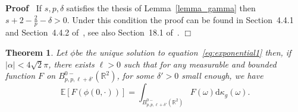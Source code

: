\documentclass[a4paper,10pt]{article}
\newcommand{\mathd}{\mathrm{d}}
\newenvironment{proof}{\noindent\textbf{Proof\ }}{\hspace*{\fill}$\Box$\medskip}
\newtheorem{theorem}{Theorem}
\begin{document}
\begin{proof}
  If $s, p, \delta$ satisfies the thesis of Lemma~\ref{lemma_gamma} then $s +
  2 - \frac{2}{p} - \delta > 0$. Under this condition the proof can be found
  in Section~4.4.1 and Section~4.4.2 of~{\cite{Triebel1992}}, see also
  Section~18.1 of~{\cite{Triebel1997}}.
\end{proof}

\begin{theorem}
  \label{theorem_dimensionalreduction1}Let $\phi$be the unique solution to
  equation~{\eqref{eq:exponential1}} then, if $| \alpha | < 4 \sqrt{2} \pi$,
  there exists $\ell > 0$ such that for any measurable and bounded function
  $F$ on $B^{0 -}_{p, p, \ell + \delta'} (\mathbb{R}^2)$, for some $\delta' >
  0$ small enough, we have
  \begin{equation}
    \mathbb{E} [F (\phi (0, \cdot))] = \int_{B^{0 -}_{p, p, \ell + \delta'}
    (\mathbb{R}^2)} F (\omega) \mathd \kappa_g (\omega) . \label{eq:final}
  \end{equation}
\end{theorem}
\end{document}
